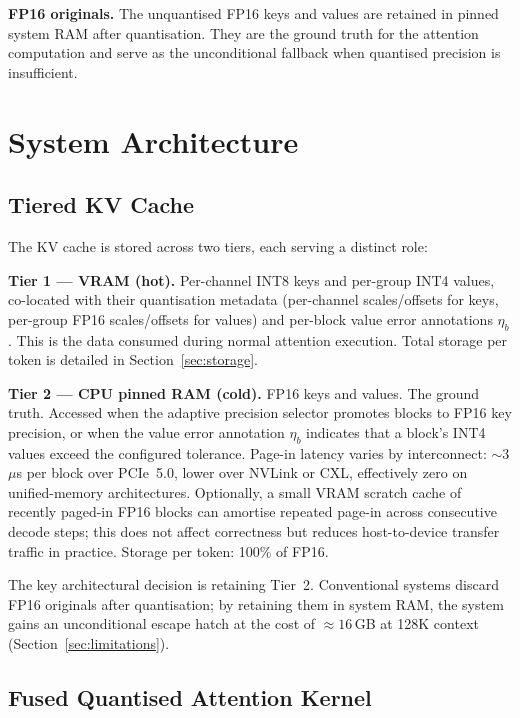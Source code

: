 \documentclass[11pt,a4paper]{article}
\theoremstyle{definition}
\theoremstyle{remark}
\begin{document}
\textbf{FP16 originals.}  The unquantised FP16 keys and values are retained in pinned system RAM after quantisation.  They are the ground truth for the attention computation and serve as the unconditional fallback when quantised precision is insufficient.


\section{System Architecture}
\label{sec:arch}

\subsection{Tiered KV Cache}
\label{sec:tiered}

The KV cache is stored across two tiers, each serving a distinct role:

\textbf{Tier 1 --- VRAM (hot).}  Per-channel INT8 keys and per-group INT4 values, co-located with their quantisation metadata (per-channel scales/offsets for keys, per-group FP16 scales/offsets for values) and per-block value error annotations $\eta_b$.  This is the data consumed during normal attention execution.  Total storage per token is detailed in Section~\ref{sec:storage}.

\textbf{Tier 2 --- CPU pinned RAM (cold).}  FP16 keys and values.  The ground truth.  Accessed when the adaptive precision selector promotes blocks to FP16 key precision, or when the value error annotation $\eta_b$ indicates that a block's INT4 values exceed the configured tolerance.  Page-in latency varies by interconnect: ${\sim}3$\,$\mu$s per block over PCIe~5.0, lower over NVLink or CXL, effectively zero on unified-memory architectures.  Optionally, a small VRAM scratch cache of recently paged-in FP16 blocks can amortise repeated page-in across consecutive decode steps; this does not affect correctness but reduces host-to-device transfer traffic in practice.  Storage per token: 100\% of FP16.

The key architectural decision is retaining Tier~2.  Conventional systems discard FP16 originals after quantisation; by retaining them in system RAM, the system gains an unconditional escape hatch at the cost of $\approx 16$\,GB at 128K context (Section~\ref{sec:limitations}).

\subsection{Fused Quantised Attention Kernel}
\label{sec:kernel}
\end{document}
